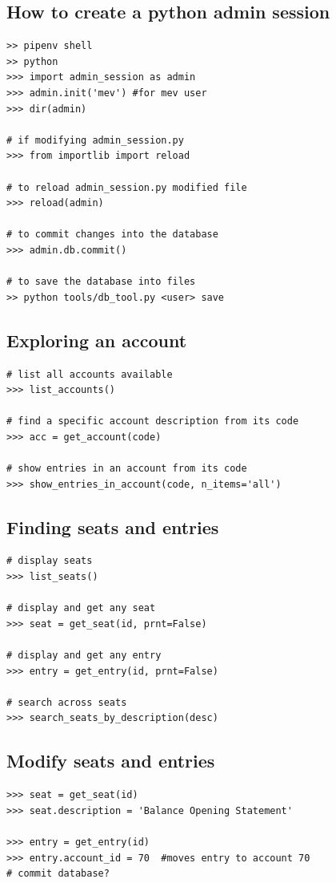 \documentclass[12pt, a4paper]{article}
\begin{document}
\subsection{How to create a python admin session}\label{admin_session}
\begin{verbatim}
>> pipenv shell
>> python
>>> import admin_session as admin  
>>> admin.init('mev') #for mev user
>>> dir(admin)

# if modifying admin_session.py 
>>> from importlib import reload

# to reload admin_session.py modified file
>>> reload(admin) 

# to commit changes into the database
>>> admin.db.commit()

# to save the database into files
>> python tools/db_tool.py <user> save
\end{verbatim}
%
\subsection{Exploring an account}
\begin{verbatim}
# list all accounts available
>>> list_accounts()

# find a specific account description from its code
>>> acc = get_account(code)

# show entries in an account from its code
>>> show_entries_in_account(code, n_items='all')
\end{verbatim}
%
\subsection{Finding seats and entries}
\begin{verbatim}
# display seats
>>> list_seats()

# display and get any seat
>>> seat = get_seat(id, prnt=False)

# display and get any entry
>>> entry = get_entry(id, prnt=False)

# search across seats
>>> search_seats_by_description(desc)
\end{verbatim}
%
\subsection{Modify seats and entries}
\begin{verbatim}
>>> seat = get_seat(id)
>>> seat.description = 'Balance Opening Statement'

>>> entry = get_entry(id)
>>> entry.account_id = 70  #moves entry to account 70
# commit database?
\end{verbatim}
\end{document}
